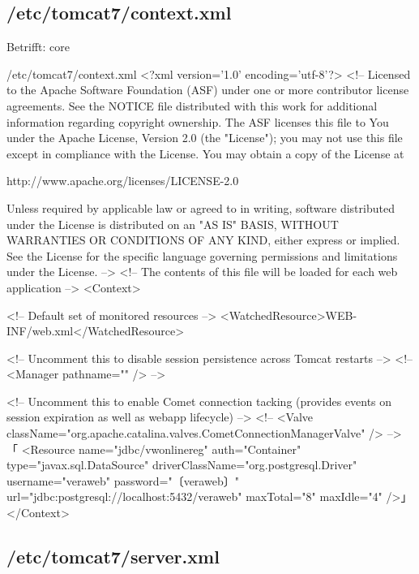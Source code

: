 \fi%

\subsection{/etc/tomcat7/context.xml}\label{subsec:refcfg-tc-ctx}

\ifoa
Betrifft: core
\fi%

\begin{lstdump}{/etc/tomcat7/context.xml}
<?xml version='1.0' encoding='utf-8'?>
<!--
  Licensed to the Apache Software Foundation (ASF) under one or more
  contributor license agreements.  See the NOTICE file distributed with
  this work for additional information regarding copyright ownership.
  The ASF licenses this file to You under the Apache License, Version 2.0
  (the "License"); you may not use this file except in compliance with
  the License.  You may obtain a copy of the License at

      http://www.apache.org/licenses/LICENSE-2.0

  Unless required by applicable law or agreed to in writing, software
  distributed under the License is distributed on an "AS IS" BASIS,
  WITHOUT WARRANTIES OR CONDITIONS OF ANY KIND, either express or implied.
  See the License for the specific language governing permissions and
  limitations under the License.
-->
<!-- The contents of this file will be loaded for each web application -->
<Context>

    <!-- Default set of monitored resources -->
    <WatchedResource>WEB-INF/web.xml</WatchedResource>

    <!-- Uncomment this to disable session persistence across Tomcat restarts -->
    <!--
    <Manager pathname="" />
    -->

    <!-- Uncomment this to enable Comet connection tacking (provides events
         on session expiration as well as webapp lifecycle) -->
    <!--
    <Valve className="org.apache.catalina.valves.CometConnectionManagerValve" />
    -->
「
    <Resource name="jdbc/vwonlinereg" auth="Container" type="javax.sql.DataSource"
     driverClassName="org.postgresql.Driver" username="veraweb" password="〔veraweb〕"
     url="jdbc:postgresql://localhost:5432/veraweb" maxTotal="8" maxIdle="4" />」
</Context>\end{lstdump}

\subsection{/etc/tomcat7/server.xml}\label{subsec:refcfg-tc-server}

